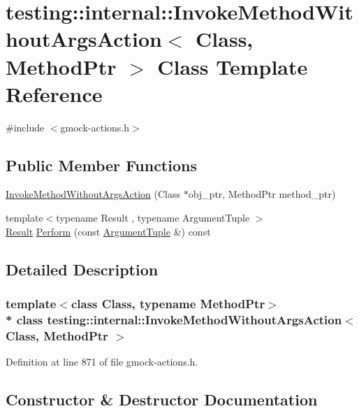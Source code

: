 \hypertarget{classtesting_1_1internal_1_1_invoke_method_without_args_action}{}\section{testing\+:\+:internal\+:\+:Invoke\+Method\+Without\+Args\+Action$<$ Class, Method\+Ptr $>$ Class Template Reference}
\label{classtesting_1_1internal_1_1_invoke_method_without_args_action}


{\ttfamily \#include $<$gmock-\/actions.\+h$>$}

\subsection*{Public Member Functions}
\begin{DoxyCompactItemize}
\item 
\hyperlink{classtesting_1_1internal_1_1_invoke_method_without_args_action_ac4d655e386f47a96c7a6e1670b20e991}{Invoke\+Method\+Without\+Args\+Action} (Class $\ast$obj\+\_\+ptr, Method\+Ptr method\+\_\+ptr)
\item 
{\footnotesize template$<$typename Result , typename Argument\+Tuple $>$ }\\\hyperlink{typedefs__d_8js_a28287671eaf7406afd604bd055ba4066}{Result} \hyperlink{classtesting_1_1internal_1_1_invoke_method_without_args_action_ad33ed69b4b6aade57c8b51ae41dfe276}{Perform} (const \hyperlink{typedefs__d_8js_a396b2bdc7ef45f482a7e9254b15c3c01}{Argument\+Tuple} \&) const 
\end{DoxyCompactItemize}


\subsection{Detailed Description}
\subsubsection*{template$<$class Class, typename Method\+Ptr$>$\\*
class testing\+::internal\+::\+Invoke\+Method\+Without\+Args\+Action$<$ Class, Method\+Ptr $>$}



Definition at line 871 of file gmock-\/actions.\+h.



\subsection{Constructor \& Destructor Documentation}
